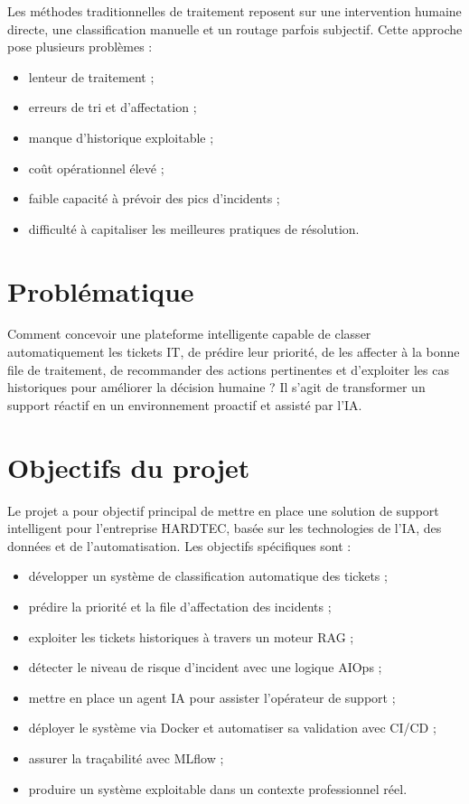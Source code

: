 \documentclass[11pt,a4paper]{report}
\begin{document}
Les méthodes traditionnelles de traitement reposent sur une intervention humaine directe, une classification manuelle et un routage parfois subjectif. Cette approche pose plusieurs problèmes :
\begin{itemize}[leftmargin=1.3em]
    \item lenteur de traitement ;
    \item erreurs de tri et d’affectation ;
    \item manque d’historique exploitable ;
    \item coût opérationnel élevé ;
    \item faible capacité à prévoir des pics d’incidents ;
    \item difficulté à capitaliser les meilleures pratiques de résolution.
\end{itemize}

\section{Problématique}
Comment concevoir une plateforme intelligente capable de classer automatiquement les tickets IT, de prédire leur priorité, de les affecter à la bonne file de traitement, de recommander des actions pertinentes et d’exploiter les cas historiques pour améliorer la décision humaine ? Il s’agit de transformer un support réactif en un environnement proactif et assisté par l’IA.

\section{Objectifs du projet}
Le projet a pour objectif principal de mettre en place une solution de support intelligent pour l’entreprise HARDTEC, basée sur les technologies de l’IA, des données et de l’automatisation. Les objectifs spécifiques sont :
\begin{itemize}[leftmargin=1.3em]
    \item développer un système de classification automatique des tickets ;
    \item prédire la priorité et la file d’affectation des incidents ;
    \item exploiter les tickets historiques à travers un moteur RAG ;
    \item détecter le niveau de risque d’incident avec une logique AIOps ;
    \item mettre en place un agent IA pour assister l’opérateur de support ;
    \item déployer le système via Docker et automatiser sa validation avec CI/CD ;
    \item assurer la traçabilité avec MLflow ;
    \item produire un système exploitable dans un contexte professionnel réel.
\end{itemize}
\end{document}
